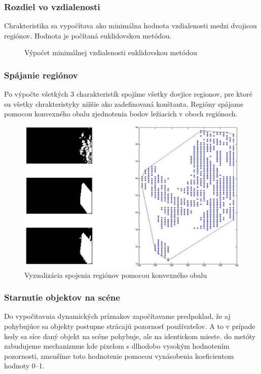 \subsubsection{Rozdiel vo vzdialenosti}
Chrakteristika sa vypočítava ako minimálna hodnota vzdialenosti medzi dvojicou regiónov.
Hodnota je počítaná euklidovskou metódou.

\begin{figure}[H]
  \begin{algorithm}[H]
   \caption{Výpočet minimálnej vzdialenosti euklidovskou metódou}
  \end{algorithm}
  \vspace{10mm}
\end{figure}

\subsubsection{Spájanie regiónov}
Po výpočte všetkých 3 charakteristík spojíme všetky dovjice regionov, pre ktoré su všetky chrakteristyky nižšie ako zadefinovaná konštanta.
Regióny spájame pomocou konvexného obalu zjednotenia bodov ležiacich v oboch regiónoch.
\begin{figure}[H]
  \centering
  \includegraphics[width=15cm]{pics/spojenie-regionov.jpg}
  \caption{Vyzualizácia spojenia regiónov pomocou konvexného obalu}
  \vspace{10mm}
\end{figure}

\subsubsection{Starnutie objektov na scéne}
Do vypočitavnia dynamických príznakov započítavame predpoklad, že aj pohybujúce sa objekty postupne strácajú pozornosť používateľov.
A to v prípade kedy sa síce daný objekt na scéne pohybuje, ale na identickom mieste.
do metóty zabudujeme mechanizmus kde pixelom s dlhodobo vysokým hodnotením pozornosti, zmenšíme toto hodnotenie pomocou  vynásobenia koeficientom hodnoty \numrange{0}{1}.

